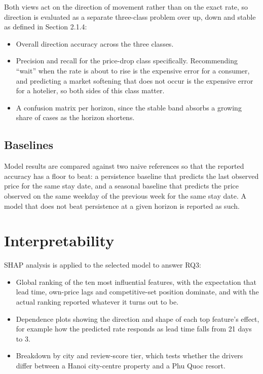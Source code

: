 Both views act on the direction of movement rather than on the exact rate, so direction is evaluated as a separate three-class problem over up, down and stable as defined in Section 2.1.4:

\begin{itemize}[leftmargin=*]
    \item Overall direction accuracy across the three classes.
    \item Precision and recall for the price-drop class specifically. Recommending ``wait'' when the rate is about to rise is the expensive error for a consumer, and predicting a market softening that does not occur is the expensive error for a hotelier, so both sides of this class matter.
    \item A confusion matrix per horizon, since the stable band absorbs a growing share of cases as the horizon shortens.
\end{itemize}

\subsection{Baselines}

Model results are compared against two naive references so that the reported accuracy has a floor to beat: a persistence baseline that predicts the last observed price for the same stay date, and a seasonal baseline that predicts the price observed on the same weekday of the previous week for the same stay date. A model that does not beat persistence at a given horizon is reported as such.

\section{Interpretability}

SHAP analysis \cite{lundberg2017} is applied to the selected model to answer RQ3:

\begin{itemize}[leftmargin=*]
    \item Global ranking of the ten most influential features, with the expectation that lead time, own-price lags and competitive-set position dominate, and with the actual ranking reported whatever it turns out to be.
    \item Dependence plots showing the direction and shape of each top feature's effect, for example how the predicted rate responds as lead time falls from 21 days to 3.
    \item Breakdown by city and review-score tier, which tests whether the drivers differ between a Hanoi city-centre property and a Phu Quoc resort.
\end{itemize}

